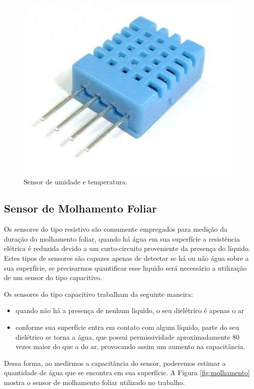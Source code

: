\begin{figure}[H]
\centering
\includegraphics[scale=0.4]{./04-figuras/sensor_DHT11.jpg}
\caption{Sensor de umidade e temperatura.}
\vspace{-\baselineskip}
\label{fig:dht11}
\end{figure}


\subsection{Sensor de Molhamento Foliar}

Os sensores do tipo resistivo são comumente empregados para medição da duração do molhamento foliar, quando há água em sua superfície a resistência elétrica é reduzida devido a um curto-circuito proveniente da presença do líquido. Estes tipos de sensores são capazes apenas de detectar se há ou não água sobre a sua superfície, se precisarmos quantificar esse liquido será necessário a utilização de um sensor do tipo capacitivo.

Os sensores do tipo capacitivo trabalham da seguinte maneira:
\begin{itemize}
\item quando não há a presença de nenhum liquido, o seu dielétrico é apenas o ar
\item conforme sua superfície entra em contato com algum líquido, parte do seu dielétrico se torna a água, que possui permissividade aproximadamente 80 vezes maior do que a do ar, provocando assim um aumento na capacitância. 
\end{itemize}
Dessa forma, ao medirmos a capacitância do sensor, poderemos estimar a quantidade de água que se encontra em sua superfície.
A Figura \ref{fig:molhamento} mostra o sensor de molhamento foliar utilizado no trabalho.


